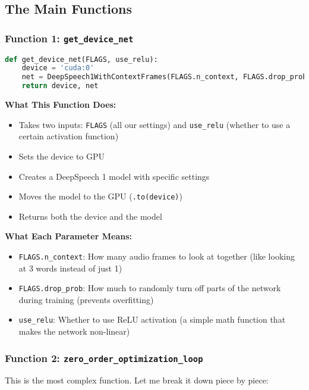 \documentclass[12pt]{article}
\begin{document}
\subsection{The Main Functions}

\subsubsection{Function 1: \texttt{get\_device\_net}}

\begin{lstlisting}[language=Python, basicstyle=\small]
def get_device_net(FLAGS, use_relu):
    device = 'cuda:0'
    net = DeepSpeech1WithContextFrames(FLAGS.n_context, FLAGS.drop_prob, use_relu=use_relu).to(device)
    return device, net
\end{lstlisting}

\textbf{What This Function Does:}
\begin{itemize}
    \item Takes two inputs: \texttt{FLAGS} (all our settings) and \texttt{use\_relu} (whether to use a certain activation function)
    \item Sets the device to GPU
    \item Creates a DeepSpeech 1 model with specific settings
    \item Moves the model to the GPU (\texttt{.to(device)})
    \item Returns both the device and the model
\end{itemize}

\textbf{What Each Parameter Means:}
\begin{itemize}
    \item \texttt{FLAGS.n\_context}: How many audio frames to look at together (like looking at 3 words instead of just 1)
    \item \texttt{FLAGS.drop\_prob}: How much to randomly turn off parts of the network during training (prevents overfitting)
    \item \texttt{use\_relu}: Whether to use ReLU activation (a simple math function that makes the network non-linear)
\end{itemize}

\subsubsection{Function 2: \texttt{zero\_order\_optimization\_loop}}

This is the most complex function. Let me break it down piece by piece:
\end{document}
